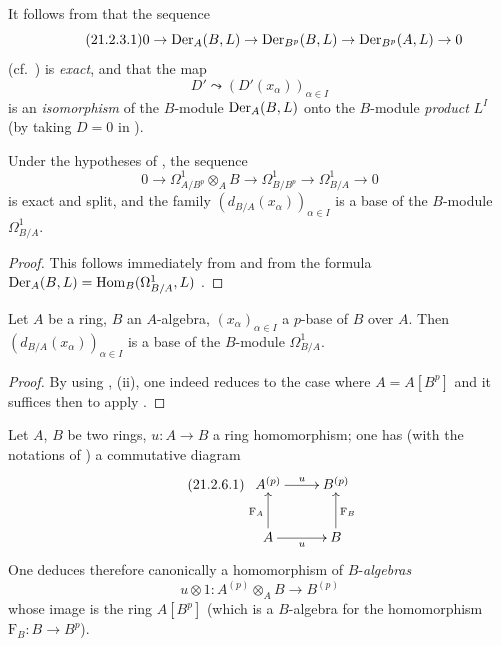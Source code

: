 It follows from  that the sequence
\begin{equation}
\tag{21.2.3.1}
  \label{0.21.2.3.1}
  0\to\operatorname{Der}_A(B,L)\to\operatorname{Der}_{B^p}(B,L)\to\operatorname{Der}_{B^p}(A,L)\to 0
\end{equation}
(cf.\ ) is \emph{exact}, and that the map
\begin{equation}
\tag{21.2.3.2}
  \label{0.21.2.3.2}
  D'\leadsto(D'(x_\alpha))_{\alpha\in I}
\end{equation}
is an \emph{isomorphism} of the $B$-module $\operatorname{Der}_A(B,L)$ onto the $B$-module \emph{product} $L^I$ (by taking $D=0$ in ).

\begin{corollary}[21.2.4]
\label{0.21.2.4}
Under the hypotheses of , the sequence
\begin{equation}
\tag{21.2.4.1}
  \label{0.21.2.4.1}
  0\to\Omega^1_{A/B^p}\otimes_A B\to\Omega^1_{B/B^p}\to\Omega^1_{B/A}\to 0
\end{equation}
is exact and split, and the family $(d_{B/A}(x_\alpha))_{\alpha\in I}$ is a base of the $B$-module $\Omega^1_{B/A}$.
\end{corollary}

\begin{proof}
This follows immediately from  and from the formula $\operatorname{Der}_A(B,L)=\operatorname{Hom}_B(\Omega^1_{B/A},L)$ .
\end{proof}

\begin{corollary}[21.2.5]
\label{0.21.2.5}
Let $A$ be a ring, $B$ an $A$-algebra, $(x_\alpha)_{\alpha\in I}$ a $p$-base of $B$ over $A$.
Then $(d_{B/A}(x_\alpha))_{\alpha\in I}$ is a base of the $B$-module $\Omega^1_{B/A}$.
\end{corollary}

\begin{proof}
By using , (ii), one indeed reduces to the case where $A=A[B^p]$ and it suffices then to apply .
\end{proof}

\begin{env}[21.2.6]
\label{0.21.2.6}
Let $A$, $B$ be two rings, $u:A\to B$ a ring homomorphism; one has (with the notations of ) a commutative diagram
\begin{equation}
\tag{21.2.6.1}
  \label{0.21.2.6.1}
\xymatrix{
  A^{(p)} \ar[r]^{u} & B^{(p)} \\
  A \ar[u]^{\mathrm{F}_A} \ar[r]_{u} & B \ar[u]_{\mathrm{F}_B}
}
\end{equation}
One deduces therefore canonically a homomorphism of $B$-\emph{algebras}
\begin{equation}
\tag{21.2.6.2}
  \label{0.21.2.6.2}
  u\otimes 1:A^{(p)}\otimes_A B\to B^{(p)}
\end{equation}
whose image is the ring $A[B^p]$ (which is a $B$-algebra for the homomorphism $\mathrm{F}_B:B\to B^p$).
\end{env}

